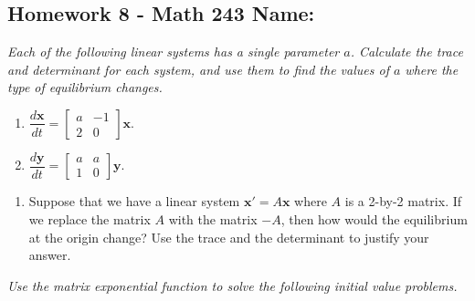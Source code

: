 \documentclass[10pt]{article}
\begin{document}
\pagestyle{empty}
\subsection*{Homework 8 - Math 243 \hfill Name: \underline{\hspace*{2in}}}


\noindent
\textit{Each of the following linear systems has a single parameter $a$. Calculate the trace and determinant for each system, and use them to find the values of $a$ where the type of equilibrium changes.}

\begin{multicols}{2}
\begin{enumerate}
\setcounter{enumi}{\theenumCount}

\item $\dfrac{d \mathbf{x}}{dt} = \begin{bmatrix} a & -1 \\ 2 & 0 \end{bmatrix} \mathbf{x}$. 

\item $\dfrac{d \mathbf{y}}{dt} = \begin{bmatrix} a & a \\ 1 & 0 \end{bmatrix} \mathbf{y}$. 

\setcounter{enumCount}{\theenumi}
\end{enumerate} 
\end{multicols}
\vfill



\begin{enumerate}
\setcounter{enumi}{\theenumCount}

\item Suppose that we have a linear system $\mathbf{x}' = A \mathbf{x}$ where $A$ is a 2-by-2 matrix.  If we replace the matrix $A$ with the matrix $-A$, then how would the equilibrium at the origin change?  Use the trace and the determinant to justify your answer. 
\vfill

\setcounter{enumCount}{\theenumi}
\end{enumerate} 



\noindent
\textit{Use the matrix exponential function to solve the following initial value problems.}
\end{document}
